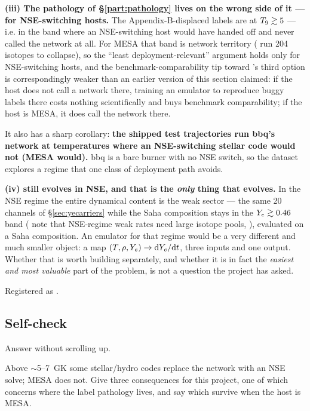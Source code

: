 \textbf{(iii) The pathology of \S\ref{part:pathology} lives on the wrong side
of it --- for NSE-switching hosts.} The Appendix-B-displaced labels are at
$T_{9} \gtrsim 5$ --- i.e. in the band where an NSE-switching host would have
handed off and never called the network at all. For MESA that band is network
territory (\citealt{farmer2016} run 204 isotopes to collapse), so the ``least
deployment-relevant'' argument holds only for NSE-switching hosts, and the
benchmark-comparability tip toward 's third option is
correspondingly weaker than an earlier version of this section claimed: if the
host does not call a network there, training an emulator to reproduce buggy
labels there costs nothing scientifically and buys benchmark comparability; if
the host is MESA, it does call the network there.

It also has a sharp corollary: \textbf{the shipped test trajectories run bbq's
network at temperatures where an NSE-switching stellar code would not (MESA
would).} bbq is a bare burner with no NSE switch, so the dataset explores a
regime that one class of deployment path avoids.

\textbf{(iv) \Ye{} still evolves in NSE, and that is the \emph{only} thing that
evolves.} In the NSE regime the entire dynamical content is the weak sector
--- the same 20 channels of \S\ref{sec:yecarriers} while the Saha composition
stays in the $Y_{e} \gtrsim 0.46$ band (\citealt[\S 8]{paxton2015} note that
NSE-regime weak rates need large isotope pools, \citealt{juodagalvis2010}),
evaluated on a Saha composition. An emulator for that regime would be a very
different and much smaller object: a map $(T, \rho, Y_{e}) \to \mathrm{d}Y_{e}/\mathrm{d} t$,
three inputs and one output. Whether that is worth building separately, and
whether it is in fact the \emph{easiest and most valuable} part of the problem,
is not a question the project has asked.

Registered as .

\subsection{Self-check}
\label{sec:selfcheck-siburn}

Answer without scrolling up.

\begin{selfcheck}
\item Above $\sim$5--7~GK some stellar/hydro codes replace the network with an
  NSE solve; MESA does not. Give three consequences for this project, one of
  which concerns where the label pathology lives, and say which survive when
  the host is MESA.
\end{selfcheck}
